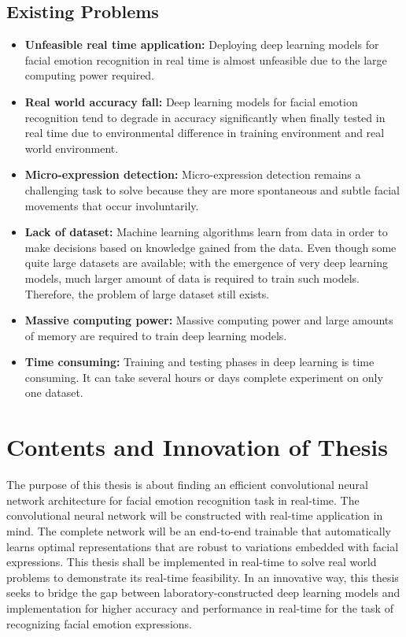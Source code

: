 \documentclass[master]{thesis-uestc}
\begin{document}
\subsection{Existing Problems}
\begin{itemize}
    \item \textbf{Unfeasible real time application:} Deploying deep learning models for facial emotion recognition in real time is almost unfeasible due to the large computing power required.
    \item \textbf{Real world accuracy fall:} Deep learning models for facial emotion recognition tend to degrade in accuracy significantly when finally tested in real time due to environmental difference in training environment and real world environment.
    \item \textbf{Micro-expression detection:} Micro-expression detection remains a challenging task to solve because they are more spontaneous and subtle facial movements that occur involuntarily.
    \item \textbf{Lack of dataset: }Machine learning algorithms learn from data in order to make decisions based on knowledge gained from the data. Even though some quite large datasets are available; with the emergence of very deep learning models, much larger amount of data is required to train such models. Therefore, the problem of large dataset still exists.
    \item\textbf{ Massive computing power:} Massive computing power and large amounts of memory are required to train deep learning models.
    \item \textbf{Time consuming:} Training and testing phases in deep learning is time consuming. It can take several hours or days complete experiment on only one dataset.
\end{itemize}

\section{Contents and Innovation of Thesis}
The purpose of this thesis is about finding an efficient convolutional neural network architecture for facial emotion recognition task in real-time. The convolutional neural network will be constructed with real-time application in mind. The complete network will be an end-to-end trainable that automatically learns optimal representations that are robust to variations embedded with facial expressions. This thesis shall be implemented in real-time to solve real world problems to demonstrate its real-time feasibility. In an innovative way, this thesis seeks to bridge the gap between laboratory-constructed deep learning models and implementation for higher accuracy and performance in real-time for the task of recognizing facial emotion expressions.
\end{document}
